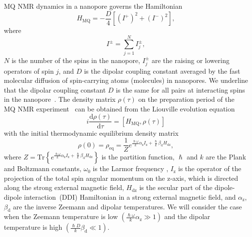 \documentclass[review]{elsarticle}
\begin{document}
MQ NMR dynamics in a nanopore governs the Hamiltonian~\cite{Doronin_2019,Doronin_2009} 
%
\begin{equation}
    \label{eq:1}
    H_{\mathrm{MQ}} = - \dfrac{D}{4} \left[
        \left(I^{+}\right)^{2} 
        + \left(I^{-}\right)^{2} 
    \right] ,
\end{equation}
%
where 
%
\begin{equation}
    \label{eq:2}
    I^{\pm} = \sum\limits_{j=1}^{N} I_{j}^{\pm},
\end{equation}
%
$N$ is the number of the spins in the nanopore, $I^{\pm}_{j}$ are the raising or lowering operators of spin $j$, and $D$ is the dipolar coupling constant averaged by the fast molecular diffusion of spin-carrying atoms (molecules) in nanopores.
We underline that the dipolar coupling constant $D$ is the same for all pairs at interacting spins in the nanopore~\cite{Doronin_2019,Doronin_2009}.
The density matrix $\rho(\tau)$ on the preparation period of the MQ NMR experiment~\cite{Baum_1985} can be obtained from the Liouville evolution equation~\cite{Goldman_1970,Abragam_1982} 
%
\begin{equation}
    \label{eq:3}
    i\dfrac{\mathrm{d}\rho(\tau)}{\mathrm{d}\tau} = \left[
    H_\mathrm{MQ},\rho(\tau)
    \right]
\end{equation}
%
with the initial thermodynamic equilibrium density matrix 
%
\begin{equation}
    \label{eq:4}
       \rho(0) = \rho_\mathrm{eq} = \dfrac{1}{Z}
       e^{
            \frac{\hslash \omega}{k} \alpha_\mathrm{z} I_\mathrm{z} 
            + \frac{\hslash }{k} \beta_\mathrm{d} H_\mathrm{dz}
        },
\end{equation}
%
where 
$Z = \mathrm{Tr} \left\{ e^{\frac{\hslash \omega}{k} \alpha_\mathrm{z} I_\mathrm{z} + \frac{\hslash  }{k} \beta_\mathrm{d} H_\mathrm{dz}} \right\}$ is the partition function, 
$\hslash$ and $k$ are the Plank and Boltzmann constants, 
$\omega_{0}$  is the Larmor frequency , $I_\mathrm{z}$ is the operator of the projection of the total spin angular momentum on the z-axis, 
which is directed along the strong external magnetic field,  
$H_\mathrm{dz}$ is the secular part of the dipole-dipole interaction~(DDI) Hamiltonian in a strong external magnetic field, and $\alpha_\mathrm{z}$, $\beta_\mathrm{d}$ are the inverse Zeemann and dipolar temperatures. 
We will consider the case when the Zeemann temperature is low $({\frac{\hslash \omega}{k} \alpha_\mathrm{z}}\gg 1)$ 
and the dipolar temperature is high $\left( \frac{\hslash{D}}{k}\beta_\mathrm{d} \ll 1\right)$.
\end{document}
